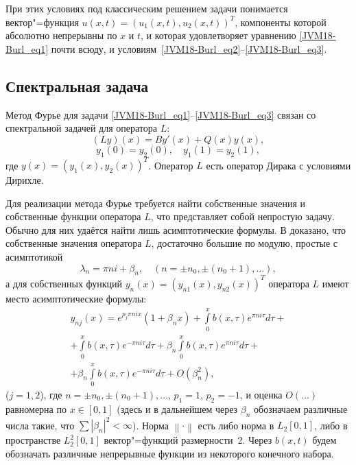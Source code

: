 При этих условиях под классическим решением задачи понимается
 вектор"=функция  \linebreak
$u(x,t)= (u_{1}(x,t), u_{2}(x,t))^{T} $, компоненты которой
абсолютно непрерывны по $x$ и $t$, и которая удовлетворяет уравнению
\eqref{JVM18-Burl_eq1} почти всюду, и
условиям~\eqref{JVM18-Burl_eq2}--\eqref{JVM18-Burl_eq3}.

\subsection{Спектральная задача}\label{Burl_sec1}

    Метод Фурье  для задачи \eqref{JVM18-Burl_eq1}--\eqref{JVM18-Burl_eq3}
связан со спектральной задачей для оператора $L$:
    $$(Ly)(x)=B{y}'(x)+Q(x)y(x),$$
    $${{y}_{1}}(0)={{y}_{2}}(0), \quad   {{y}_{1}}(1)={{y}_{2}}(1),$$
где  $y(x)={{({{y}_{1}}(x),{{y}_{2}}(x))}^{T}}$. Оператор $L$ есть
оператор Дирака с условиями Дирихле.

Для реализации метода Фурье требуется найти собственные значения и
собственные функции оператора $L$, что представляет собой непростую
задачу. Обычно для них удаётся найти лишь асимптотические формулы. В
\cite{Burl7}
  доказано, что собственные значения оператора $L$,
достаточно большие по модулю, простые с асимптотикой
    $${{\lambda }_{n}}=\pi ni+{{\beta }_{n}}, \quad   (n=\pm {{n}_{0}},\pm ({{n}_{0}}+1),\ldots ),$$
а для собственных функций
${{y}_{n}}(x)={{({{y}_{n1}}(x),{{y}_{n2}}(x))}^{T}}$ оператора $L$
имеют место асимптотические формулы:
\begin{multline}\label{Burl_eq4}
	{{y}_{nj}}(x)={{e}^{{{p}_{j}}\pi nix}}\left( 1+{{\beta }_{n}}x
	\right)+\int\limits_{0}^{x}{b(x,\tau ){{e}^{\pi ni\tau }}d\tau}+
	\\+
	\int\limits_{0}^{x}{b(x,\tau ){{e}^{-\pi ni\tau }}d\tau
	}+
	{{\beta }_{n}}\int\limits_{0}^{x}{b(x,\tau ){{e}^{\pi ni\tau
	}}d\tau }
	+
	\\+
	{{\beta }_{n}}\int\limits_{0}^{x}{b(x,\tau ){{e}^{-\pi
	ni\tau }}d\tau }
		+O(\beta _{n}^{2}),
\end{multline}
  ($j=1,2$), где $n=\pm {{n}_{0}},\pm ({{n}_{0}}+1),\ldots $,
${{p}_{1}}=1$, ${{p}_{2}}=-1$, и оценка $O(\ldots )$ равномерна по
$x\in [0,1]$ (здесь и в дальнейшем через ${{\beta }_{n}}$ обозначаем
различные числа  такие, что $\sum{{{\left| {{\beta }_{n}}
\right|}^{2}}}<\infty $). Норма $\left\| \cdot  \right\|$ есть либо
норма в ${{L}_{2}}[0,1]$, либо в пространстве $L_{2}^{2}[0,1]$
вектор"=функций размерности~2. Через $b(x,t)$ будем обозначать
различные непрерывные функции из некоторого конечного набора.






